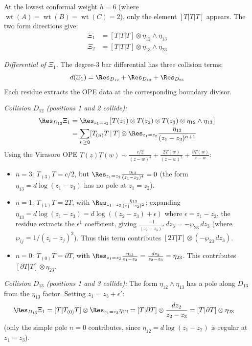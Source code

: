 \begin{computation}
\label{comp:w3-deg3-structure}

At the lowest conformal weight $h = 6$ (where
$\operatorname{wt}(A) = \operatorname{wt}(B) = \operatorname{wt}(C) = 2$),
only the element $[T|T|T]$ appears.  The two form directions give:
\begin{align}
\Xi_1 &= [T|T|T] \otimes \eta_{12} \wedge \eta_{13}
\label{eq:w3-deg3-xi1} \\
\Xi_2 &= [T|T|T] \otimes \eta_{13} \wedge \eta_{23}
\label{eq:w3-deg3-xi2}
\end{align}

\emph{Differential of $\Xi_1$.}
The degree-3 bar differential has three collision terms:
\[
d(\Xi_1) = \Res_{D_{12}} + \Res_{D_{13}} + \Res_{D_{23}}
\]
Each residue extracts the OPE data at the corresponding boundary divisor.

\emph{Collision $D_{12}$ (positions 1 and 2 collide):}
\begin{align*}
\Res_{D_{12}}\Xi_1
&= \Res_{z_1 = z_2}\bigl[T(z_1) \otimes T(z_2)
\otimes T(z_3) \otimes \eta_{12} \wedge \eta_{13}\bigr] \\
&= \sum_{n \geq 0} [T_{(n)}T \,|\, T] \otimes
\Res_{z_1 = z_2}\frac{\eta_{13}}{(z_1-z_2)^{n+1}}
\end{align*}
Using the Virasoro OPE
$T(z)T(w) \sim \frac{c/2}{(z-w)^4} + \frac{2T(w)}{(z-w)^2}
+ \frac{\partial T(w)}{z-w}$:
\begin{itemize}
\item $n = 3$: $T_{(3)}T = c/2$, but $\Res_{z_1=z_2}
\frac{\eta_{13}}{(z_1-z_2)^4} = 0$ (the form $\eta_{13}
= d\log(z_1-z_3)$ has no pole at $z_1 = z_2$).
\item $n = 1$: $T_{(1)}T = 2T$, with $\Res_{z_1=z_2}
\frac{\eta_{13}}{(z_1-z_2)^2}$; expanding
$\eta_{13} = d\log(z_1-z_3) = d\log((z_2-z_3)+\epsilon)$ where
$\epsilon = z_1-z_2$, the residue extracts the $\epsilon^1$
coefficient, giving $\frac{-1}{(z_2-z_3)^2}\,dz_3 = -\wp_{23}\,dz_3$
(where $\wp_{ij} = 1/(z_i-z_j)^2$).  Thus this term contributes
$[2T|T] \otimes (-\wp_{23}\,dz_3)$.
\item $n = 0$: $T_{(0)}T = \partial T$, with $\Res_{z_1=z_2}
\frac{\eta_{13}}{z_1-z_2} = \frac{dz_2}{z_2-z_3} = \eta_{23}$.
This contributes $[\partial T|T] \otimes \eta_{23}$.
\end{itemize}

\emph{Collision $D_{13}$ (positions 1 and 3 collide):}
The form $\eta_{12} \wedge \eta_{13}$ has a pole along $D_{13}$
from the $\eta_{13}$ factor.  Setting $z_1 = z_3 + \epsilon'$:
\begin{align*}
\Res_{D_{13}}\Xi_1
&= [T|T_{(0)}T] \otimes \Res_{z_1=z_3}\eta_{12}
= [T|\partial T] \otimes \frac{dz_2}{z_2-z_3}
= [T|\partial T] \otimes \eta_{23}
\end{align*}
(only the simple pole $n = 0$ contributes, since $\eta_{12}
= d\log(z_1-z_2)$ is regular at $z_1 = z_3$).


\end{computation}

